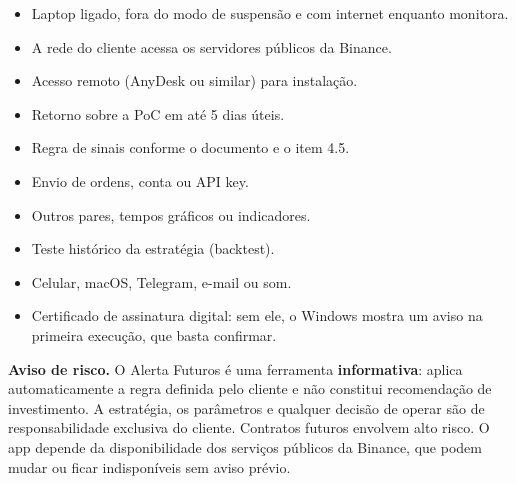 \documentclass[11pt,a4paper]{article}
\newcommand{\icoCross} {\textcolor{sinalZ}{\ding{55}}}
\newcommand{\icoBullet}{\textcolor{cyandk}{\ding{108}}}
\begin{document}
\begin{tcbraster}[raster columns=2, raster equal height, raster column skip=5mm]
  \begin{tcolorbox}[enhanced, colback=white, colframe=borderc, arc=4pt, title={Premissas}, colbacktitle=lightbg, coltitle=navy, fonttitle=\bfseries\small]
    \small
    \begin{itemize}[leftmargin=1.2em, itemsep=2pt, topsep=0pt]
      \item[\icoBullet] Laptop ligado, fora do modo de suspensão e com internet enquanto monitora.
      \item[\icoBullet] A rede do cliente acessa os servidores públicos da Binance.
      \item[\icoBullet] Acesso remoto (AnyDesk ou similar) para instalação.
      \item[\icoBullet] Retorno sobre a PoC em até 5 dias úteis.
      \item[\icoBullet] Regra de sinais conforme o documento e o item 4.5.
    \end{itemize}
  \end{tcolorbox}
  \begin{tcolorbox}[enhanced, colback=white, colframe=borderc, arc=4pt, title={Fora de escopo}, colbacktitle=lightbg, coltitle=navy, fonttitle=\bfseries\small]
    \small
    \begin{itemize}[leftmargin=1.2em, itemsep=2pt, topsep=0pt]
      \item[\icoCross] Envio de ordens, conta ou API key.
      \item[\icoCross] Outros pares, tempos gráficos ou indicadores.
      \item[\icoCross] Teste histórico da estratégia (backtest).
      \item[\icoCross] Celular, macOS, Telegram, e-mail ou som.
      \item[\icoCross] Certificado de assinatura digital: sem ele, o Windows mostra um aviso
        na primeira execução, que basta confirmar.
    \end{itemize}
  \end{tcolorbox}
\end{tcbraster}

\begin{tcolorbox}[goldbox]
  \small\textbf{Aviso de risco.} O Alerta Futuros é uma ferramenta \textbf{informativa}: aplica
  automaticamente a regra definida pelo cliente e não constitui recomendação de investimento.
  A estratégia, os parâmetros e qualquer decisão de operar são de responsabilidade exclusiva do
  cliente. Contratos futuros envolvem alto risco. O app depende da disponibilidade dos serviços
  públicos da Binance, que podem mudar ou ficar indisponíveis sem aviso prévio.
\end{tcolorbox}
\end{document}
